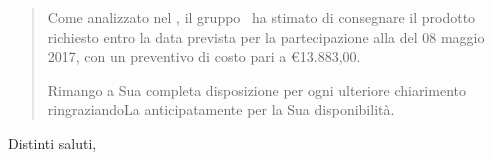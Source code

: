 \documentclass{letter}
\begin{document}
\begin{letter}
\begin{quotation}
	Come analizzato nel \pianodiprogettov, il gruppo \kpanic\ ha stimato di consegnare il prodotto richiesto entro la data prevista per la partecipazione alla \textbf{\revisionediaccettazione} del 08 maggio 2017, con un preventivo di costo pari a \euro 13.883,00.

	Rimango a Sua completa disposizione per ogni ulteriore chiarimento ringraziandoLa anticipatamente per la Sua disponibilità.

\end{quotation}

\closing{Distinti saluti,}

\end{letter}
\end{document}
